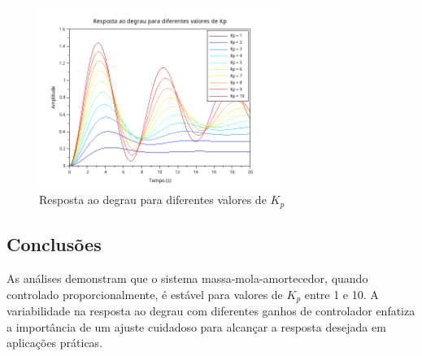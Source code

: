 \begin{figure}[H]
    \centering
    \includegraphics[width=0.7\textwidth]{atividades/4-atividade/assets/impulsos-diferentes-kp.png}
    \caption{Resposta ao degrau para diferentes valores de \( K_p \)}
    \label{fig:resposta-degrau-kp}
\end{figure}

\subsection{Conclusões}
As análises demonstram que o sistema massa-mola-amortecedor, quando controlado proporcionalmente, é estável para valores de \( K_p \) entre 1 e 10. A variabilidade na resposta ao degrau com diferentes ganhos de controlador enfatiza a importância de um ajuste cuidadoso para alcançar a resposta desejada em aplicações práticas.